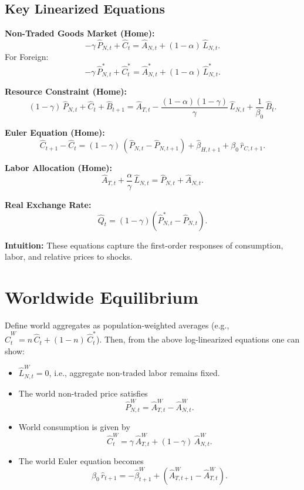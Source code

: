 \documentclass[a4paper,12pt]{article} %
\theoremstyle{nonitalic}
\begin{document}
\subsection*{Key Linearized Equations}

\textbf{Non-Traded Goods Market (Home):}
\[
-\gamma\,\hat{P}_{N,t} + \hat{C}_t = \hat{A}_{N,t} + (1-\alpha)\,\hat{L}_{N,t}. \tag{7a}
\]
For Foreign:
\[
-\gamma\,\hat{P}^*_{N,t} + \hat{C}^*_t = \hat{A}^*_{N,t} + (1-\alpha)\,\hat{L}^*_{N,t}.
\]

\textbf{Resource Constraint (Home):}
\[
(1-\gamma)\,\hat{P}_{N,t} + \hat{C}_t + \hat{B}_{t+1} = \hat{A}_{T,t} - \frac{(1-\alpha)(1-\gamma)}{\gamma}\,\hat{L}_{N,t} + \frac{1}{\beta_0}\,\hat{B}_t. \tag{7b}
\]

\textbf{Euler Equation (Home):}
\[
\hat{C}_{t+1}-\hat{C}_t = (1-\gamma)\,(\hat{P}_{N,t}-\hat{P}_{N,t+1}) + \hat{\beta}_{H,t+1} + \beta_0\,\hat{r}_{C,t+1}. \tag{7c}
\]

\textbf{Labor Allocation (Home):}
\[
\hat{A}_{T,t} + \frac{\alpha}{\gamma}\,\hat{L}_{N,t} = \hat{P}_{N,t} + \hat{A}_{N,t}. \tag{7d}
\]

\textbf{Real Exchange Rate:}
\[
\hat{Q}_t = (1-\gamma)(\hat{P}^*_{N,t}-\hat{P}_{N,t}).
\]

\textbf{Intuition:} These equations capture the first-order responses of consumption, labor, and relative prices to shocks.

\section{Worldwide Equilibrium}

Define world aggregates as population-weighted averages (e.g., \( \hat{C}^W_t = n\,\hat{C}_t + (1-n)\,\hat{C}^*_t \)). Then, from the above log-linearized equations one can show:
\begin{itemize}
    \item \(\hat{L}^W_{N,t} = 0\), i.e., aggregate non-traded labor remains fixed.
    \item The world non-traded price satisfies
    \[
    \hat{P}^W_{N,t} = \hat{A}^W_{T,t} - \hat{A}^W_{N,t}.
    \]
    \item World consumption is given by
    \[
    \hat{C}^W_t = \gamma\,\hat{A}^W_{T,t} + (1-\gamma)\,\hat{A}^W_{N,t}.
    \]
    \item The world Euler equation becomes
    \[
    \beta_0\,\hat{r}_{t+1} = -\hat{\beta}^W_{t+1} + \left(\hat{A}^W_{T,t+1}-\hat{A}^W_{T,t}\right).
    \]
\end{itemize}
\end{document}
